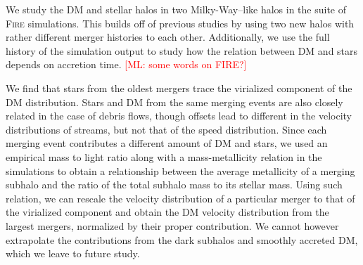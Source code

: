 \documentclass[twocolumn,preprintnumbers]{aastex6}
\def\ML#1{\textcolor{red}{[ML: #1]}}
\begin{document}

We study the DM and stellar halos in two Milky-Way--like halos in the suite of \textsc{Fire} simulations.  
This builds off of previous studies by using two new halos with rather different merger histories to each other.  Additionally, we use the full history of the simulation output to study how the relation between DM and stars depends on accretion time. \ML{some words on FIRE?}

We find that stars from the oldest mergers trace the virialized component of the DM distribution. Stars and DM from the same merging events are also closely related in the case of debris flows, though offsets lead to different in the velocity distributions of streams, but not that of the speed distribution. 
Since each merging event contributes a different amount of DM and stars, we used an empirical mass to light ratio along with a mass-metallicity relation in the simulations to obtain a relationship between the average metallicity of a merging subhalo and the ratio of the total subhalo mass to its stellar mass. Using such relation, we can rescale the velocity distribution of a particular merger to that of the virialized component and obtain the DM velocity distribution from the largest mergers, normalized by their proper contribution. We cannot however extrapolate the contributions from the dark subhalos and smoothly accreted DM, which we leave to future study.
\end{document}
